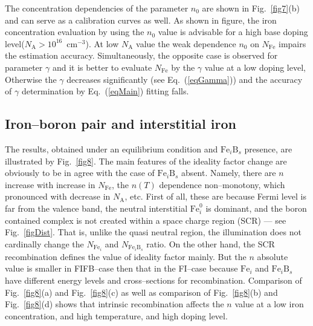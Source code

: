 \documentclass [sort&compress] {elsarticle}
\begin{document}
The concentration dependencies of the parameter $n_0$ are shown in Fig.~\ref{fig7}(b) and can serve as a calibration curves as well.
As shown in figure, the iron concentration evaluation by using the $n_0$ value is advisable for a high base doping level($N_\mathrm{A}>10^{16}$~cm$^{-3}$).
At low $N_\mathrm{A}$ value the weak dependence $n_0$ on $N_\mathrm{Fe}$ impairs the estimation accuracy.
Simultaneously, the opposite case is observed for parameter $\gamma$ and
it is better to evaluate  $N_\mathrm{Fe}$ by the $\gamma$ value at a low doping level,
Otherwise the $\gamma$ decreases significantly (see Eq.~(\ref{eqGamma})) and the accuracy of $\gamma$ determination by Eq.~(\ref{eqMain}) fitting falls.


\subsection{Iron--boron pair and interstitial iron}

The results, obtained under an equilibrium condition and $\mathrm{Fe}_i\mathrm{B}_s$ presence, are illustrated by Fig.~\ref{fig8}.
The main features of the ideality factor change are obviously to be in agree with the case of $\mathrm{Fe}_i\mathrm{B}_s$ absent.
Namely, there are $n$ increase with increase in $N_\mathrm{Fe}$, the $n(T)$ dependence non--monotony, which pronounced with decrease in $N_\mathrm{A}$, etc.
First of all, these are because Fermi level is far from the valence band, the neutral  interstitial $\mathrm{Fe}_i^0$ is dominant,
and the boron contained complex  is  not created within a space charge region (SCR) --- see Fig.~\ref{figDist}.
That is, unlike the quasi neutral region, the illumination does not cardinally change  the $N_{\mathrm{Fe}_i}$ and $N_{\mathrm{Fe}_i\mathrm{B}_s}$ ratio.
On the other hand, the SCR recombination defines the value of ideality factor mainly.
But the $n$ absolute  value  is smaller in FIFB--case then that in the FI--case because $\mathrm{Fe}_i$ and $\mathrm{Fe}_i\mathrm{B}_s$ have different energy levels and cross--sections for recombination.
Comparison of Fig.~\ref{fig8}(a) and Fig.~\ref{fig8}(c) as well as  comparison of Fig.~\ref{fig8}(b) and Fig.~\ref{fig8}(d)
shows that intrinsic recombination affects the $n$ value at a low iron concentration, and high temperature, and high doping level.
\end{document}

